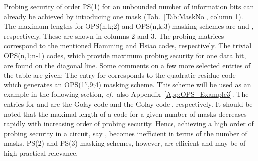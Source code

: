 \documentclass[11pt]{llncs}
\newcommand{\cf}{{\it cf.\ }}
\begin{document}
Probing security of order PS(1) for an unbounded number of
information bits can already be achieved by introducing one mask
(Tab.~\ref{Tab:MaskNo}, column 1).
The maximum lengths for OPS(n,k;2) and OPS(n,k;3) masking schemes
are  and , respectively.
These are shown in columns 2 and 3.
The probing matrices correspond to the mentioned Hamming and Hsiao codes, respectively.
The trivial OPS(n,1;n-1) codes, which provide maximum probing security for one data bit,
are found on the diagonal line.
Some comments on a few more selected entries of the table are given:
The entry for  corresponds to the  quadratic
residue code which generates an OPS(17,9;4)
masking scheme. This scheme will be used as an example in the following section,
\cf also Appendix~\ref{App:OPS_Example3}.
The entries for  and  are
the  Golay code  and
the  Golay code , respectively.
It should be noted that the maximal length of a code for a given number of masks
decreases rapidly with increasing order of probing security.
Hence, achieving a high order of probing security in a circuit,
say , becomes inefficient in terms of the number of masks.
PS(2) and PS(3) masking schemes, however, are efficient and
may be of high practical relevance.
\end{document}
